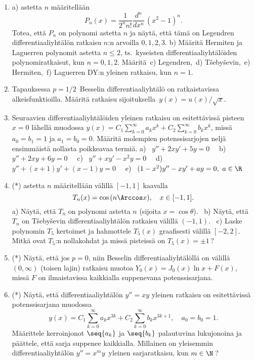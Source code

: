\begin{enumerate}
\item {}
a)  astetta $n$ määritellään
\[
P_n(x)=\frac{1}{2^n n!}\frac{d^n}{dx^n}\,(x^2-1)^n.
\]
Totea, että $P_n$ on polynomi astetta $n$ ja näytä, että tämä on Legendren 
differentiaaliyhtälön ratkaisu $n$:n arvoilla $0,1,2,3$. \vspace{1mm}\newline
b) Määritä Hermiten ja Laguerren polynomit astetta $n \le 2$, ts.\ kyseisten
differentiaaliyhtälöiden polynomiratkaisut, kun $n=0,1,2$. \vspace{1mm}\newline
Määritä\, c) Legendren,\, d) T\v{s}eby\v{s}evin,\, e) Hermiten,\, f) Laguerren
DY:n yleinen ratkaisu, kun $n=1$.

\item \label{H-dy-6: Besselin erikoistapaus}
Tapauksessa $p=1/2\,$ Besselin differentiaaliyhtälö on ratkaistavissa alkeisfunktioilla.
Määritä ratkaisu sijoituksella $\,y(x)=u(x)/\sqrt{x}$.

\item 
Seuraavien differentiaaliyhtälöiden yleinen ratkaisu on esitettävissä pisteen $x=0$ lähellä 
muodossa $y(x)=C_1\sum_{k=0}^\infty a_k x^k+C_2\sum_{k=0}^\infty b_k x^k$, missä $a_0=b_1=1$ ja
$a_1=b_0=0$. Määritä molempien potenssisarjojen neljä ensimmäistä nollasta poikkeavaa
termiä. \vspace{1.5mm}\newline
a) \ $y''+2xy'+5y=0 \quad$
b) \ $y''+2xy+6y=0 \quad$
c) \ $y''+xy'-x^2y=0 \quad$ \newline
d) \ $y''+(x+1)y'+(x-1)y=0 \quad$
e) \ $(1-x^2)y''-xy'+ay=0,\ a\in\R$

\item (*) 
 astetta $n$ määritellään välillä $[-1,1]$ kaavalla
\[
T_n(x)=\cos\,(n\Arccos x), \quad x\in[-1,1].
\]
a) Näytä, että $T_n$ on polynomi astetta $n$ (sijoita $x=\cos\theta$). \ b) Näytä, että $T_n$
on T\v{s}eby\v{s}evin differentiaaliyhtälön ratkaisu välillä $(-1,1)$. \ c) Laske polynomin
$T_5$ kertoimet ja hahmottele $T_5(x)$ graafisesti välillä $[-2,2]$. Mitkä ovat $T_5$:n
nollakohdat ja missä pisteissä on $T_5(x)=\pm 1\,$?

\item (*) \label{H-dy-6: Besselin toinen laji}
Näytä, että jos $p=0$, niin Besselin differentiaaliyhtälöllä on välillä $(0,\infty)$
(toisen lajin) ratkaisu muotoa $Y_0(x)=J_0(x)\ln x+F(x)$, missä $F$ on ilmaistavissa kaikkialla
suppenevana potenssisarjana.

\item (*)
Näytä, että differentiaaliyhtälön $y''=xy$ yleinen ratkaisu on esitettävissä potenssisarjana
muodossa
\[
y(x)=C_1 \sum_{k=0}^\infty a_k x^{3k} + C_2 \sum_{k=0}^\infty b_k x^{3k+1}, \quad a_0=b_0=1.
\]
Määrittele kerroinjonot $\seq{a_k}$ ja $\seq{b_k}$ palautuvina lukujonoina ja päättele, että
sarja suppenee kaikkialla. Millainen on yleisemmin differentiaaliyhtälön $y''=x^my\,$ yleinen
sarjaratkaisu, kun $m\in\N\,$?

\end{enumerate}